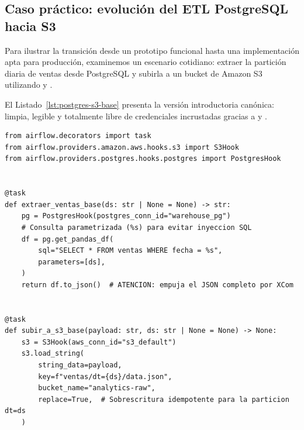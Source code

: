 \subsection{Caso práctico: evolución del ETL PostgreSQL hacia S3}

Para ilustrar la transición desde un prototipo funcional hasta una implementación apta para producción, examinemos un escenario cotidiano: extraer la partición diaria de ventas desde PostgreSQL y subirla a un bucket de Amazon S3 utilizando  y .

El Listado~\ref{lst:postgres-s3-base} presenta la versión introductoria canónica: limpia, legible y totalmente libre de credenciales incrustadas gracias a  y .

\begin{lstlisting}[style=python, caption={Versión base didáctica de extracción PostgreSQL $\rightarrow$ S3 con \code{PostgresHook} y \code{S3Hook}.}, label={lst:postgres-s3-base}]
from airflow.decorators import task
from airflow.providers.amazon.aws.hooks.s3 import S3Hook
from airflow.providers.postgres.hooks.postgres import PostgresHook


@task
def extraer_ventas_base(ds: str | None = None) -> str:
    pg = PostgresHook(postgres_conn_id="warehouse_pg")
    # Consulta parametrizada (%s) para evitar inyeccion SQL
    df = pg.get_pandas_df(
        sql="SELECT * FROM ventas WHERE fecha = %s",
        parameters=[ds],
    )
    return df.to_json()  # ATENCION: empuja el JSON completo por XCom


@task
def subir_a_s3_base(payload: str, ds: str | None = None) -> None:
    s3 = S3Hook(aws_conn_id="s3_default")
    s3.load_string(
        string_data=payload,
        key=f"ventas/dt={ds}/data.json",
        bucket_name="analytics-raw",
        replace=True,  # Sobrescritura idempotente para la particion dt=ds
    )
\end{lstlisting}

